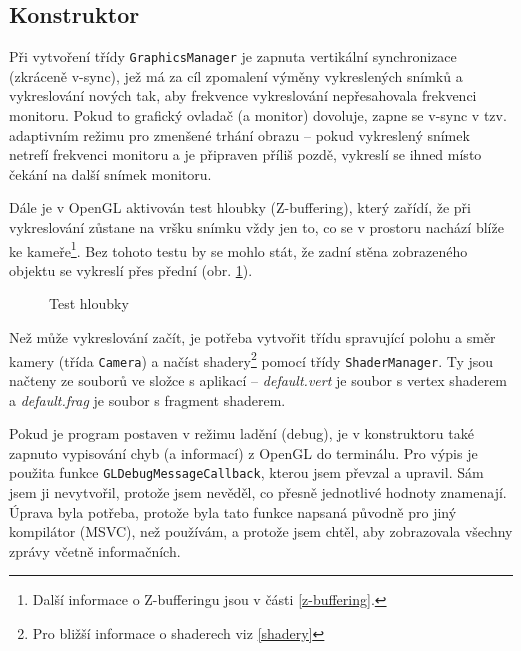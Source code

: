 \documentclass[a4paper, 11pt]{report}
\begin{document}
\subsection{Konstruktor}
Při vytvoření třídy \texttt{GraphicsManager} je zapnuta vertikální synchronizace (zkráceně v-sync), jež má za cíl zpomalení výměny vykreslených snímků a vykreslování nových tak, aby frekvence vykreslování nepřesahovala frekvenci monitoru. Pokud to grafický ovladač (a monitor) dovoluje, zapne se v-sync v tzv. adaptivním režimu pro zmenšené trhání obrazu -- pokud vykreslený snímek netrefí frekvenci monitoru a je připraven příliš pozdě, vykreslí se ihned místo čekání na další snímek monitoru.

Dále je v OpenGL aktivován test hloubky (Z-buffering), který zařídí, že při vykreslování zůstane na vršku snímku vždy jen to, co se v prostoru nachází blíže ke kameře\footnote{Další informace o Z-bufferingu jsou v části \ref{z-buffering}.}. Bez tohoto testu by se mohlo stát, že zadní stěna zobrazeného objektu se vykreslí přes přední (obr. \ref{depthtest}).

\begin{figure}[h]
    \centering
    \qquad
    \caption{\label{depthtest}Test hloubky}
\end{figure}

Než může vykreslování začít, je potřeba vytvořit třídu spravující polohu a směr kamery (třída \texttt{Camera}) a načíst shadery\footnote{Pro bližší informace o shaderech viz \ref{shadery}} pomocí třídy \texttt{ShaderManager}. Ty jsou načteny ze souborů ve složce s aplikací -- \emph{default.vert} je soubor s vertex shaderem a \emph{default.frag} je soubor s fragment shaderem.

Pokud je program postaven v režimu ladění (debug), je v konstruktoru také zapnuto vypisování chyb (a informací) z OpenGL do terminálu. Pro výpis je použita funkce \texttt{GLDebugMessageCallback}, kterou jsem převzal a upravil. Sám jsem ji nevytvořil, protože jsem nevěděl, co přesně jednotlivé hodnoty znamenají. Úprava byla potřeba, protože byla tato funkce napsaná původně pro jiný kompilátor (MSVC), než používám, a protože jsem chtěl, aby zobrazovala všechny zprávy včetně informačních.
\end{document}
